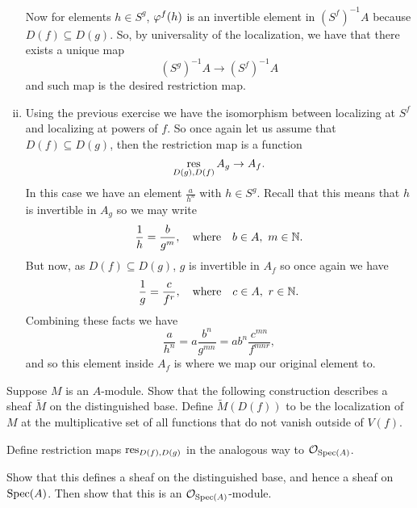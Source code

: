 \documentclass[12pt]{memoir}
\begin{document}
\begin{ptcbr}
\begin{enumerate}[i)]
\begin{center}
    \end{center}
    Now for elements $h\in S^g$, $\varphi^f(h)$ is an invertible element in $(S^f)^{-1}A$ because $D(f)\subseteq D(g)$. So, by universality of the localization, we have that there exists a unique map 
    $$(S^g)^{-1}A\to(S^f)^{-1}A$$
    and such map is the desired restriction map.
    \item Using the previous exercise we have the isomorphism between localizing at $S^f$ and localizing at powers of $f$. So once again let us assume that $D(f)\subseteq D(g)$, then the restriction map is a function 
    $$\operatorname*{res}_{D(g),D(f)}A_g\to A_f.$$
    In this case we have an element $\frac{a}{h^n}$ with $h\in S^g$. Recall that this means that $h$ is invertible in $A_g$ so we may write 
    $$\frac{1}{h}=\frac{b}{g^m},\word{where}b\in A,\ m\in\bN.$$
    But now, as $D(f)\subseteq D(g)$, $g$ is invertible in $A_f$ so once again we have 
    $$\frac{1}{g}=\frac{c}{f^r},\word{where}c\in A,\ r\in\bN.$$
    Combining these facts we have 
    $$\frac{a}{h^n}=a\frac{b^n}{g^{mn}}=ab^n\frac{c^{mn}}{f^{mnr}},$$
    and so this element inside $A_f$ is where we map our original element to.
    \end{enumerate}
    \end{ptcbr}

    \begin{Ej}[4.1.D Vakil]
        Suppose $M$ is an $A$-module. Show
that the following construction describes a sheaf $\widetilde{M}$ on the distinguished base. Define $\widetilde{M}(D(f))$ to be the localization of $M$ at the multiplicative set of all functions that do not vanish outside of $V(f)$.\par
 Define restriction maps $\operatorname*{res}_{D(f),D(g)}$ in the analogous way to $\mathcal{O}_{\operatorname{Spec}(A)}$.\par
  Show that this defines a sheaf on the distinguished base, and hence a sheaf on $\operatorname{Spec}(A)$. Then show that this is an $\mathcal{O}_{\operatorname{Spec}(A)}$-module.
    \end{Ej}
    
\end{document}
